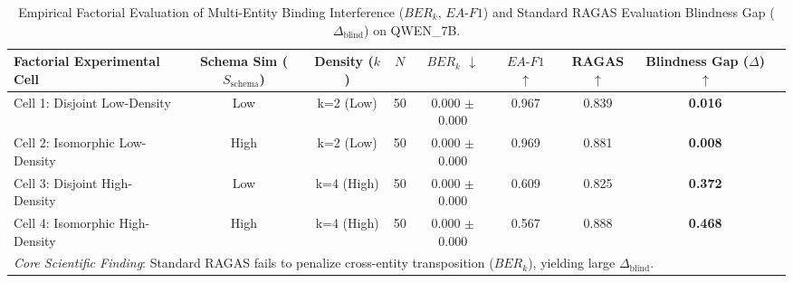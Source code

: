 \begin{table}[t]
\centering
\small
\caption{Empirical Factorial Evaluation of Multi-Entity Binding Interference ($BER_k$, $EA\text{-}F1$) and Standard RAGAS Evaluation Blindness Gap ($\Delta_{\text{blind}}$) on QWEN_7B.}
\label{tab:factorial_anova_qwen_7b}
\begin{tabular*}{\textwidth}{@{\extracolsep{\fill}}lcccccccc@{}}
\toprule
\textbf{Factorial Experimental Cell} & \textbf{Schema Sim ($S_{\text{schema}}$)} & \textbf{Density ($k$)} & \textbf{$N$} & \textbf{$BER_k$ $\downarrow$} & \textbf{$EA\text{-}F1$ $\uparrow$} & \textbf{RAGAS $\uparrow$} & \textbf{Blindness Gap ($\Delta$) $\uparrow$} \\
\midrule
  Cell 1: Disjoint Low-Density & Low & k=2 (Low) & 50 & 0.000 $\pm$ 0.000 & 0.967 & 0.839 & \textbf{0.016} \\
  Cell 2: Isomorphic Low-Density & High & k=2 (Low) & 50 & 0.000 $\pm$ 0.000 & 0.969 & 0.881 & \textbf{0.008} \\
  Cell 3: Disjoint High-Density & Low & k=4 (High) & 50 & 0.000 $\pm$ 0.000 & 0.609 & 0.825 & \textbf{0.372} \\
  Cell 4: Isomorphic High-Density & High & k=4 (High) & 50 & 0.000 $\pm$ 0.000 & 0.567 & 0.888 & \textbf{0.468} \\
\midrule
\multicolumn{8}{l}{\textit{Core Scientific Finding}: Standard RAGAS fails to penalize cross-entity transposition ($BER_k$), yielding large $\Delta_{\text{blind}}$.} \\
\bottomrule
\end{tabular*}
\end{table}
